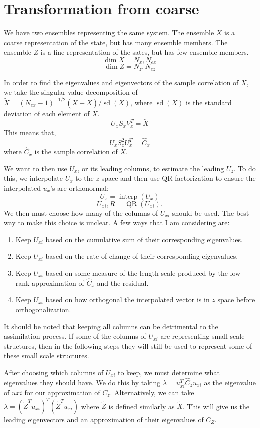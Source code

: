\documentclass[11pt]{article} %
\DeclareMathOperator{\interp}{interp}
\DeclareMathOperator{\QR}{QR}
\DeclareMathOperator{\sd}{sd}
\begin{document}
\section{Transformation from coarse}



We have two ensembles representing the same system.
The ensemble $X$ is a coarse representation of the state, but has many ensemble members.
The ensemble $Z$ is a fine representation of the sates, but has few ensemble members.
\[
\dim{X} = N_x, N_{ex}
\]
\[
\dim{Z} = N_z, N_{ez}
\]

In order to find the eigenvalues and eigenvectors of the sample correlation of $X$, we take the singular value decomposition of $\tilde{X} = {(N_{ex} - 1)}^{-1/2} (X - \bar{X})/ \sd(X)$, where $\sd(X)$ is the standard deviation of each element of $X$.
\[
U_x S_x V_x^T = \tilde{X}
\]
This means that,
\[
U_x S_z^2 U_x^T = \hat{C}_x
\]
where $\hat{C}_x$ is the sample correlation of $X$.

We want to then use $U_x$, or its leading columns, to estimate the leading $U_z$.
To do this, we interpolate $U_x$ to the $z$ space and then use QR factorization to ensure the interpolated $u_x$'s are orthonormal:
\[
U_{x} = \interp (U_x)
\]
\[
U_{xi}, R = \QR (U_{xi}).
\]
We then must choose how many of the columns of $U_{xi}$ should be used.
The best way to make this choice is unclear.
A few ways that I am considering are:
\begin{enumerate}
\item Keep $U_{xi}$ based on the cumulative sum of their corresponding eigenvalues.
\item Keep $U_{xi}$ based on the rate of change of their corresponding eigenvalues.
\item Keep $U_{xi}$ based on some measure of the length scale produced by the low rank approximation of $\hat{C}_x$ and the residual.
\item Keep $U_{xi}$ based on how orthogonal the interpolated vector is in $z$ space before orthogonalization.
\end{enumerate}
It should be noted that keeping all columns can be detrimental to the assimilation process.
If some of the columns of $U_{xi}$ are representing small scale structures, then in the following steps they will still be used to represent some of these small scale structures.

After choosing which columns of $U_{xi}$ to keep, we must determine what eigenvalues they should have.
We do this by taking $\lambda = u_{xi}^T \hat{C}_z u_{xi}$ as the eigenvalue of $u{xi}$ for our approximation of $C_z$.
Alternatively, we can take $\lambda = {(\tilde{Z}^T u_{xi})}^T (\tilde{Z}^T u_{xi})$ where $\tilde{Z}$ is defined similarly as $\tilde{X}$.
This will give us the leading eigenvectors and an approximation of their eigenvalues of $C_Z$.
\end{document}
